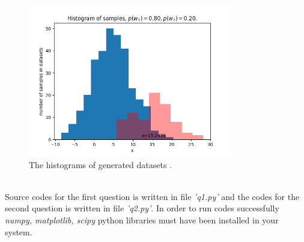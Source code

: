 \documentclass[12pt]{article}
\begin{document}
 \begin{figure}[h]
  \centerline{\includegraphics[width=3.5in]{hist08.png}}
  \caption{The histograms of generated datasets .}
  \label{fig:Histograms pw1=pw2}
\end{figure}\\
Source codes for the first question is written in file \textit{'q1.py'} and the codes for the second question is written in file \textit{'q2.py'}. In order to run codes successfully \textit{numpy, matplotlib, scipy} python libraries must have been installed in your system. 
\end{document}
